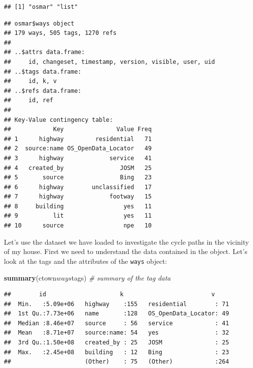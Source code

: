 \documentclass[]{article}
\newenvironment{Shaded}{}{}
\newcommand{\KeywordTok}[1]{\textcolor[rgb]{0.00,0.44,0.13}{\textbf{{#1}}}}
\newcommand{\CommentTok}[1]{\textcolor[rgb]{0.38,0.63,0.69}{\textit{{#1}}}}
\newcommand{\NormalTok}[1]{{#1}}
\begin{document}
\begin{verbatim}
## [1] "osmar" "list"
\end{verbatim}

\begin{Shaded}
\end{Shaded}

\begin{verbatim}
## osmar$ways object
## 179 ways, 505 tags, 1270 refs 
## 
## ..$attrs data.frame: 
##     id, changeset, timestamp, version, visible, user, uid 
## ..$tags data.frame: 
##     id, k, v 
## ..$refs data.frame: 
##     id, ref 
##  
## Key-Value contingency table:
##            Key               Value Freq
## 1      highway         residential   71
## 2  source:name OS_OpenData_Locator   49
## 3      highway             service   41
## 4   created_by                JOSM   25
## 5       source                Bing   23
## 6      highway        unclassified   17
## 7      highway             footway   15
## 8     building                 yes   11
## 9          lit                 yes   11
## 10      source                 npe   10
\end{verbatim}

Let's use the dataset we have loaded to investigate the cycle paths in
the vicinity of my house. First we need to understand the data contained
in the object. Let's look at the tags and the attributes of the
\texttt{ways} object:

\begin{Shaded}
\begin{Highlighting}[]
\KeywordTok{summary}\NormalTok{(ctown$ways$tags)  }\CommentTok{# summary of the tag data}
\end{Highlighting}
\end{Shaded}

\begin{verbatim}
##        id                     k                         v      
##  Min.   :5.09e+06   highway    :155   residential        : 71  
##  1st Qu.:7.73e+06   name       :128   OS_OpenData_Locator: 49  
##  Median :8.46e+07   source     : 56   service            : 41  
##  Mean   :8.71e+07   source:name: 54   yes                : 32  
##  3rd Qu.:1.50e+08   created_by : 25   JOSM               : 25  
##  Max.   :2.45e+08   building   : 12   Bing               : 23  
##                     (Other)    : 75   (Other)            :264
\end{verbatim}
\end{document}
